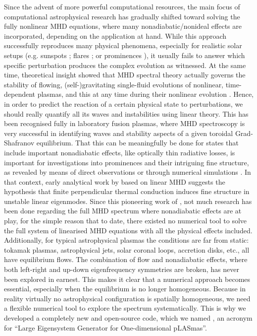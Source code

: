 Since the advent of more powerful computational resources, the main focus of computational astrophysical research has gradually shifted toward solving the fully nonlinear MHD equations, where many nonadiabatic/nonideal effects are incorporated, depending on the application at hand. While this approach successfully reproduces many physical phenomena, especially for realistic solar setups (e.g. sunspots \citep{rempel2012}; flares \citep{ruan2019}; or prominences \citep{xia2016}), it usually fails to answer which specific perturbation produces the complex evolution as witnessed. At the same time, theoretical insight showed that MHD spectral theory actually governs the stability of flowing, (self-)gravitating single-fluid evolutions of nonlinear, time-dependent plasmas, and this at any time during their nonlinear evolution \citep{demaerel2016}. Hence, in order to predict the reaction of a certain physical state to perturbations, we should really quantify all its waves and instabilities using linear theory. This has been recognised fully in laboratory fusion plasmas, where MHD spectroscopy is very successful in identifying waves and stability aspects of a given toroidal Grad-Shafranov equilibrium. That this can be meaningfully be done for states that include important nonadiabatic effects, like optically thin radiative losses, is important for investigations into prominences and their intriguing fine structure, as revealed by means of direct observations \citep{engvold1998,ballester2006,mackay2010} or through numerical simulations \citep{xia2016,xia2017,claes2020}. In that context, early analytical work by \citet{vanderlinden1991} based on linear MHD suggests the hypothesis that finite perpendicular thermal conduction induces fine structure in unstable linear eigenmodes. Since this pioneering work of \citet{vanderlinden1991}, not much research has been done regarding the full MHD spectrum where nonadiabatic effects are at play, for the simple reason that to date, there existed no numerical tool to solve the full system of linearised MHD equations with all the physical effects included. Additionally, for typical astrophysical plasmas the conditions are far from static: tokamak plasmas, astrophysical jets, solar coronal loops, accretion disks, etc., all have equilibrium flows. The combination of flow and nonadiabatic effects, where both left-right and up-down eigenfrequency symmetries are broken, has never been explored in earnest. This makes it clear that a numerical approach becomes essential, especially when the equilibrium is no longer homogeneous. Because in reality virtually no astrophysical configuration is spatially homogeneous, we need a flexible numerical tool to explore the spectrum systematically. This is why we developed a completely new and open-source code, which we named {\legolas}, an acronym for ``Large Eigensystem Generator for One-dimensional pLASmas''.

